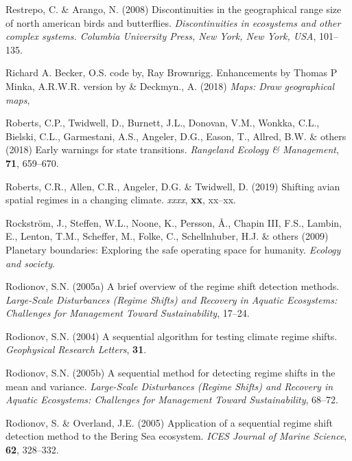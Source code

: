 \documentclass[print]{nuthesis}
\begin{document}
\leavevmode\hypertarget{ref-restrepo2008discontinuities}{}%
Restrepo, C. \& Arango, N. (2008) Discontinuities in the geographical range size of north american birds and butterflies. \emph{Discontinuities in ecosystems and other complex systems. Columbia University Press, New York, New York, USA}, 101--135.

\leavevmode\hypertarget{ref-maps}{}%
Richard A. Becker, O.S. code by, Ray Brownrigg. Enhancements by Thomas P Minka, A.R.W.R. version by \& Deckmyn., A. (2018) \emph{Maps: Draw geographical maps},

\leavevmode\hypertarget{ref-roberts2018early}{}%
Roberts, C.P., Twidwell, D., Burnett, J.L., Donovan, V.M., Wonkka, C.L., Bielski, C.L., Garmestani, A.S., Angeler, D.G., Eason, T., Allred, B.W. \& others (2018) Early warnings for state transitions. \emph{Rangeland Ecology \& Management}, \textbf{71}, 659--670.

\leavevmode\hypertarget{ref-roberts2019shifting}{}%
Roberts, C.R., Allen, C.R., Angeler, D.G. \& Twidwell, D. (2019) Shifting avian spatial regimes in a changing climate. \emph{xxxx}, \textbf{xx}, xx--xx.

\leavevmode\hypertarget{ref-rockstrom_planetary_2009}{}%
Rockström, J., Steffen, W.L., Noone, K., Persson, Å., Chapin III, F.S., Lambin, E., Lenton, T.M., Scheffer, M., Folke, C., Schellnhuber, H.J. \& others (2009) Planetary boundaries: Exploring the safe operating space for humanity. \emph{Ecology and society}.

\leavevmode\hypertarget{ref-rodionov_brief_2005}{}%
Rodionov, S.N. (2005a) A brief overview of the regime shift detection methods. \emph{Large-Scale Disturbances (Regime Shifts) and Recovery in Aquatic Ecosystems: Challenges for Management Toward Sustainability}, 17--24.

\leavevmode\hypertarget{ref-rodionov2004sequential}{}%
Rodionov, S.N. (2004) A sequential algorithm for testing climate regime shifts. \emph{Geophysical Research Letters}, \textbf{31}.

\leavevmode\hypertarget{ref-rodionov_sequential_2005}{}%
Rodionov, S.N. (2005b) A sequential method for detecting regime shifts in the mean and variance. \emph{Large-Scale Disturbances (Regime Shifts) and Recovery in Aquatic Ecosystems: Challenges for Management Toward Sustainability}, 68--72.

\leavevmode\hypertarget{ref-rodionov_application_2005}{}%
Rodionov, S. \& Overland, J.E. (2005) Application of a sequential regime shift detection method to the Bering Sea ecosystem. \emph{ICES Journal of Marine Science}, \textbf{62}, 328--332.
\end{document}
